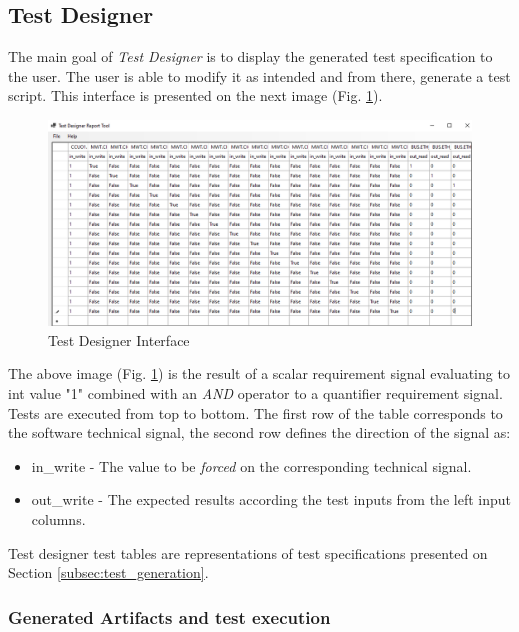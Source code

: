 \subsection{Test Designer}
\label{subsec:test_designer}

The main goal of \textit{Test Designer} is to display the generated test specification to the user. The user is able to modify it as intended and from there, generate a test script. This interface is presented on the next image (Fig. \ref{fig:test_designer_interface}).

\begin{figure}[H]
    \centering
    \includegraphics[width=\textwidth]{images/test_designer.PNG}
    \caption{Test Designer Interface}
    \label{fig:test_designer_interface}
\end{figure}

The above image (Fig. \ref{fig:test_designer_interface}) is the result of a scalar requirement signal evaluating to int value "1" combined with an \textit{AND} operator to a quantifier requirement signal. Tests are executed from top to bottom.
The first row of the table corresponds to the software technical signal, the second row defines the direction of the signal as:

\begin{itemize}
    \item in\_write - The value to be \textit{forced} on the corresponding technical signal.
    \item out\_write - The expected results according the test inputs from the left input columns.
\end{itemize}

Test designer test tables are representations of test specifications presented on Section \ref{subsec:test_generation}.


\subsubsection{Generated Artifacts and test execution}
\label{subsubsec:generated_artifacts}

